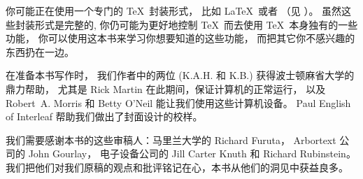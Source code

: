 你可能正在使用一个专门的 \TeX\ 封装形式，
比如 \LaTeX\ 或者 \AMSTeX （见 ）。
虽然这些封装形式是完整的, 你仍可能为更好地控制 \TeX\ 而去使用 \TeX\ 本身独有的一些功能，
你可以使用这本书来学习你想要知道的这些功能，
而把其它你不感兴趣的东西扔在一边。

在准备本书写作时，
我们作者中的两位 (K.A.H. 和 K.B.) 获得波士顿麻省大学的鼎力帮助，
尤其是 Rick Martin 在此期间，保证计算机的正常运行，
以及 Robert~A. Morris 和 Betty O'Neil 能让我们使用这些计算机设备。
Paul English of Interleaf 帮助我们做出了封面设计的校样。

我们需要感谢本书的这些审稿人：马里兰大学的 Richard Furuta，
Arbortext 公司的 John Gourlay，
电子设备公司的 Jill Carter Knuth 和 Richard Rubinstein。
我们把他们对我们原稿的观点和批评铭记在心，本书从他们的洞见中获益良多。

